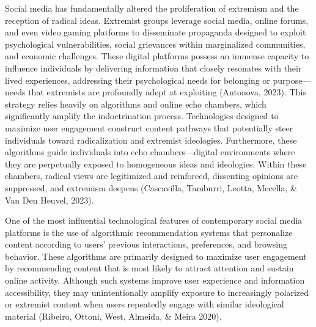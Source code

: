 \documentclass[10pt]{NSP1}
\begin{document}
\par\medskip{}\smallskip

Social media has fundamentally altered the proliferation of extremism and the reception of radical ideas. Extremist groups leverage social media, online forums, and even video gaming platforms to disseminate propaganda designed to exploit psychological vulnerabilities, social grievances within marginalized communities, and economic challenges. These digital platforms possess an immense capacity to influence individuals by delivering information that closely resonates with their lived experiences, addressing their psychological needs for belonging or purpose—needs that extremists are profoundly adept at exploiting (Antonova, 2023). This strategy relies heavily on algorithms and online echo chambers, which significantly amplify the indoctrination process. Technologies designed to maximize user engagement construct content pathways that potentially steer individuals toward radicalization and extremist ideologies. Furthermore, these algorithms guide individuals into echo chambers—digital environments where they are perpetually exposed to homogeneous ideas and ideologies. Within these chambers, radical views are legitimized and reinforced, dissenting opinions are suppressed, and extremism deepens (Cascavilla, Tamburri, Leotta, Mecella, \& Van Den Heuvel, 2023).

\par\medskip{}\smallskip

One of the most influential technological features of contemporary social media platforms is the use of algorithmic recommendation systems that personalize content according to users' previous interactions, preferences, and browsing behavior. These algorithms are primarily designed to maximize user engagement by recommending content that is most likely to attract attention and sustain online activity. Although such systems improve user experience and information accessibility, they may unintentionally amplify exposure to increasingly polarized or extremist content when users repeatedly engage with similar ideological material (Ribeiro, Ottoni, West, Almeida, \& Meira 2020).
\end{document}
